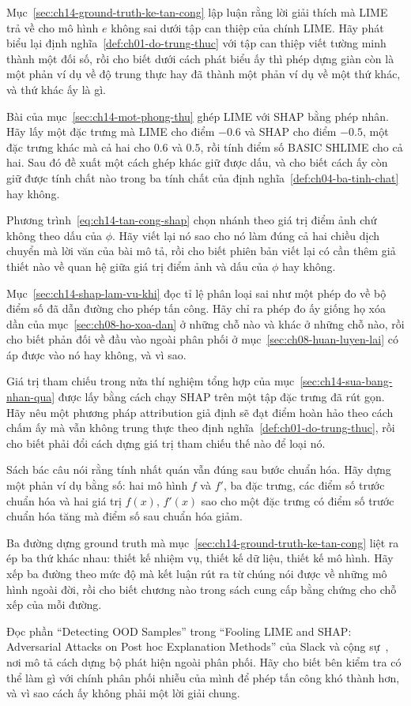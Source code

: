 \cauhoi
\begin{cauhoids}
  \item Mục~\ref{sec:ch14-ground-truth-ke-tan-cong} lập luận rằng lời giải thích
mà LIME trả về cho mô hình $e$ không sai dưới tập can thiệp của chính LIME. Hãy
phát biểu lại định nghĩa~\ref{def:ch01-do-trung-thuc} với tập can thiệp viết
tường minh thành một đối số, rồi cho biết dưới cách phát biểu ấy thì phép dựng
giàn còn là một phản ví dụ về độ trung thực hay đã thành một phản ví dụ về một
thứ khác, và thứ khác ấy là gì.
  \item Bài của mục~\ref{sec:ch14-mot-phong-thu} ghép LIME với SHAP bằng phép
nhân. Hãy lấy một đặc trưng mà LIME cho điểm $-0.6$ và SHAP cho điểm $-0.5$,
một đặc trưng khác mà cả hai cho $0.6$ và $0.5$, rồi tính điểm số BASIC SHLIME
cho cả hai. Sau đó đề xuất một cách ghép khác giữ được dấu, và cho biết cách ấy
còn giữ được tính chất nào trong ba tính chất của định
nghĩa~\ref{def:ch04-ba-tinh-chat} hay không.
  \item Phương trình~\ref{eq:ch14-tan-cong-shap} chọn nhánh theo giá trị điểm
ảnh chứ không theo dấu của $\phi$. Hãy viết lại nó sao cho nó làm đúng cả hai
chiều dịch chuyển mà lời văn của bài mô tả, rồi cho biết phiên bản viết lại có
cần thêm giả thiết nào về quan hệ giữa giá trị điểm ảnh và dấu của $\phi$ hay
không.
  \item Mục~\ref{sec:ch14-shap-lam-vu-khi} đọc tỉ lệ phân loại sai như một phép
đo về bộ điểm số đã dẫn đường cho phép tấn công. Hãy chỉ ra phép đo ấy giống họ
xóa dần của mục~\ref{sec:ch08-ho-xoa-dan} ở những chỗ nào và khác ở những chỗ
nào, rồi cho biết phản đối về đầu vào ngoài phân phối ở
mục~\ref{sec:ch08-huan-luyen-lai} có áp được vào nó hay không, và vì sao.
  \item Giá trị tham chiếu trong nửa thí nghiệm tổng hợp của
mục~\ref{sec:ch14-sua-bang-nhan-qua} được lấy bằng cách chạy SHAP trên một tập
đặc trưng đã rút gọn. Hãy nêu một phương pháp attribution giả định sẽ đạt điểm
hoàn hảo theo cách chấm ấy mà vẫn không trung thực theo định
nghĩa~\ref{def:ch01-do-trung-thuc}, rồi cho biết phải đổi cách dựng giá trị
tham chiếu thế nào để loại nó.
  \item Sách bác câu nói rằng tính nhất quán vẫn đúng sau bước chuẩn hóa. Hãy
dựng một phản ví dụ bằng số: hai mô hình $f$ và $f'$, ba đặc trưng, các điểm số
trước chuẩn hóa và hai giá trị $f(x)$, $f'(x)$ sao cho một đặc trưng có điểm số
trước chuẩn hóa tăng mà điểm số sau chuẩn hóa giảm.
  \item Ba đường dựng ground truth mà mục~\ref{sec:ch14-ground-truth-ke-tan-cong}
liệt ra ép ba thứ khác nhau: thiết kế nhiệm vụ, thiết kế dữ liệu, thiết kế mô
hình. Hãy xếp ba đường theo mức độ mà kết luận rút ra từ chúng nói được về
những mô hình ngoài đời, rồi cho biết chương nào trong sách cung cấp bằng chứng
cho chỗ xếp của mỗi đường.
  \item Đọc phần \enquote{Detecting OOD Samples} trong \enquote{Fooling LIME and
SHAP: Adversarial Attacks on Post hoc Explanation Methods} của Slack và cộng
sự~\autocite{mfooling}, nơi mô tả cách dựng bộ phát hiện ngoài phân phối. Hãy
cho biết bên kiểm tra có thể làm gì với chính phân phối nhiễu của mình để phép
tấn công khó thành hơn, và vì sao cách ấy không phải một lời giải chung.
\end{cauhoids}
